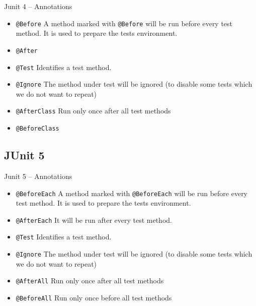 \documentclass[11pt, xcolor=svgnames]{beamer}
\begin{document}

\begin{frame}{Junit 4 -- Annotations}

\begin{itemize}
  \item \texttt{@Before} A method marked with \texttt{@Before} will be run before every test method. It is used to prepare the tests environment.
  \item \texttt{@After}
  \item \texttt{@Test} Identifies a test method.
  \item \texttt{@Ignore} The method under test will be ignored (to disable some tests which we do not want to repeat)
  \item \texttt{@AfterClass} Run only once after all test methods
  \item \texttt{@BeforeClass}
  \end{itemize}
\end{frame}


\subsection{JUnit 5}


\begin{frame}{Junit 5 -- Annotations}

  \begin{itemize}
    \item \texttt{@BeforeEach} A method marked with \texttt{@BeforeEach} will be run before every test method. It is used to prepare the tests environment.
    \item \texttt{@AfterEach} It will be run after every test method.
    \item \texttt{@Test} Identifies a test method.
    \item \texttt{@Ignore} The method under test will be ignored (to disable some tests which we do not want to repeat)
    \item \texttt{@AfterAll} Run only once after all test methods
    \item \texttt{@BeforeAll} Run only once before all test methods
    \end{itemize}
  \end{frame}
 
\end{document}

